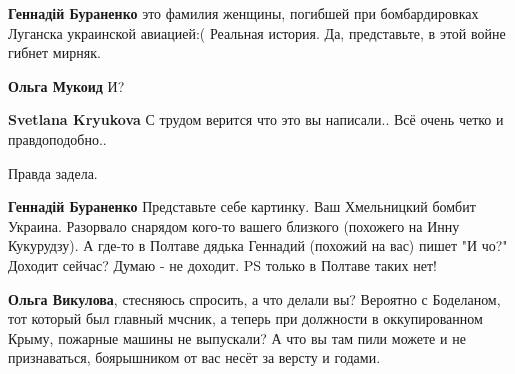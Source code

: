 \begin{itemize}
\begin{itemize}
\textbf{Геннадій Бураненко} это фамилия женщины, погибшей при бомбардировках Луганска украинской авиацией:( Реальная история. Да, представьте, в этой войне гибнет мирняк.

 
\textbf{Ольга Мукоид} И?

 
\textbf{Svetlana Kryukova} С трудом верится что это вы написали.. Всё очень четко и правдоподобно..

 
Правда задела.

 
\textbf{Геннадій Бураненко} Представьте себе картинку.
Ваш Хмельницкий бомбит Украина. Разорвало снарядом кого-то вашего близкого (похожего на Инну Кукурудзу).
А где-то в Полтаве дядька Геннадий (похожий на вас) пишет "И чо?"
Доходит сейчас?
Думаю - не доходит.
PS только в Полтаве таких нет!

 
\textbf{Ольга Викулова}, стесняюсь спросить, а что делали вы? Вероятно с Боделаном, тот который был главный мчсник, а теперь при должности в оккупированном Крыму, пожарные машины не выпускали? А что вы там пили можете и не признаваться, боярышником от вас несёт за версту и годами.

 

\end{itemize}
\end{itemize}
